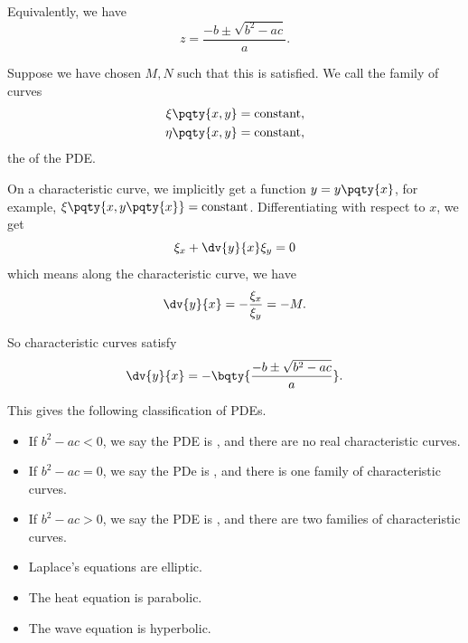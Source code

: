 Equivalently, we have
\begin{equation}
    z = \frac{-b \pm \sqrt{b^2 - a c}}{a}.
\end{equation}

Suppose we have chosen \(M, N\) such that this is satisfied. We call the family of curves
\begin{subequations}
    \begin{align}
        \xi\pqty{x, y} &= \text{constant}, \\
        \eta\pqty{x, y} &= \text{constant},
    \end{align}
\end{subequations}
the  of the PDE.

On a characteristic curve, we implicitly get a function \(y = y\pqty{x}\), for example, \(\xi\pqty{x, y\pqty{x}} = \text{constant}\). Differentiating with respect to \(x\), we get
\begin{equation}
    \xi_x + \dv{y}{x} \xi_y = 0
\end{equation}
which means along the characteristic curve, we have
\begin{equation}
    \dv{y}{x} = - \frac{\xi_x}{\xi_y} = -M.
\end{equation}

So characteristic curves satisfy
\begin{equation}
    \dv{y}{x} = - \bqty{\frac{-b \pm \sqrt{b^2 - a c}}{a}}.
\end{equation}

This gives the following classification of PDEs.

\begin{itemize}
    \item If \(b^2 - ac < 0\), we say the PDE is , and there are no real characteristic curves.
    \item If \(b^2 - ac = 0\), we say the PDe is , and there is one family of characteristic curves.
    \item If \(b^2 - ac > 0\), we say the PDE is , and there are two families of characteristic curves.
\end{itemize}

\begin{examples}
    \begin{itemize}
        \item Laplace's equations are elliptic.
        \item The heat equation is parabolic.
        \item The wave equation is hyperbolic.
    \end{itemize}
\end{examples}

